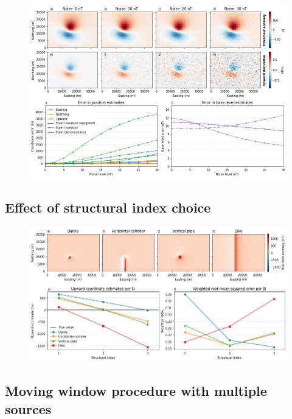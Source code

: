 \begin{figure}[tb!]
\centering
\includegraphics[width=1\linewidth]{figures/synthetic-noise-levels.png}
\caption{
  \lipsum[1]
}
\label{fig:noise}
\end{figure}

\label{sec:si}
\subsection{Effect of structural index choice}

\begin{figure}[tb!]
\centering
\includegraphics[width=1\linewidth]{figures/synthetic-structural-index.png}
\caption{
  \lipsum[1]
}
\label{fig:si}
\end{figure}

\subsection{Moving window procedure with multiple sources}

